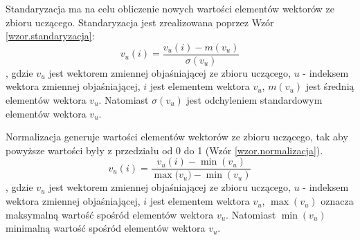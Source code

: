 \documentclass[a4paper,twoside,12pt]{book}
\begin{document}
    Standaryzacja ma na celu obliczenie nowych wartości elementów wektorów ze zbioru uczącego.
    Standaryzacja jest zrealizowana poprzez Wzór \ref{wzor.standaryzacja}:
    \large
    \begin{equation}
    {v}
        _{u}(i) = \frac{{v}_{u}(i)-m({v}_{u})}{\sigma({v}_{u})}
        \label{wzor.standaryzacja}
    \end{equation}
    \normalsize
    , gdzie ${v}_{u}$ jest wektorem zmiennej objaśniającej ze zbioru uczącego, $u$ - indeksem wektora zmiennej
    objaśniającej, $i$ jest elementem wektora ${v}_{u}$, $m({v}_{u})$ jest średnią elementów wektora
    ${v}_{u}$. Natomiast $\sigma({v}_{u})$ jest odchyleniem standardowym elementów wektora ${v}_{u}$.

    Normalizacja generuje wartości elementów wektorów ze zbioru uczącego, tak aby powyższe wartości były z przedziału
    od 0 do 1 (Wzór \ref{wzor.normalizacja}).
    \large
    \begin{equation}
    {v}
        _{u}(i) = \frac{{v}_{u}(i)-\min({{v}_{u}})}{\max({{v}_{u})}-\min({{v}_{u}})}
        \label{wzor.normalizacja}
    \end{equation}
    \normalsize
    , gdzie ${v}_{u}$ jest wektorem zmiennej objaśniającej ze zbioru uczącego, $u$ - indeksem wektora zmiennej
    objaśniającej, $i$ jest elementem wektora ${v}_{u}$, $\max({v}_{u})$ oznacza maksymalną wartość spośród elementów
    wektora ${v}_{u}$. Natomiast $\min({v}_{u})$ minimalną wartość spośród elementów
    wektora ${v}_{u}$.
\end{document}
